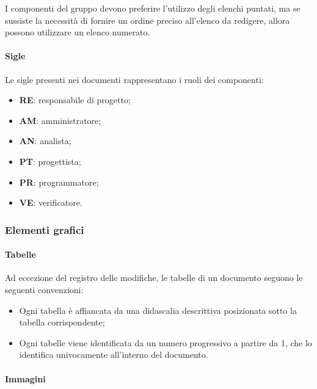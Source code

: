 I componenti del gruppo devono preferire l'utilizzo degli elenchi puntati, ma se sussiste la necessità di fornire un ordine preciso all'elenco da redigere, allora possono utilizzare un elenco numerato.

\paragraph{Sigle}
Le sigle presenti nei documenti rappresentano i ruoli dei componenti:
\begin{itemize}

	\item \textbf{RE}: responsabile di progetto;
	
	\item \textbf{AM}: amministratore;
	
	\item \textbf{AN}: analista;
	
	\item \textbf{PT}: progettista;
	
	\item \textbf{PR}: programmatore;
	
	\item \textbf{VE}: verificatore.

\end{itemize}

\subsubsection{Elementi grafici}
\paragraph{Tabelle}
Ad eccezione del registro delle modifiche, le tabelle di un documento seguono le seguenti convenzioni:
\begin{itemize}

	\item Ogni tabella è affiancata da una didascalia descrittiva posizionata sotto la tabella corrispondente;
	
	\item Ogni tabelle viene identificata da un numero progressivo a partire da 1, che lo identifica univocamente all'interno del documento.

\end{itemize}
\paragraph{Immagini}

